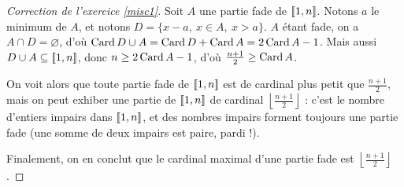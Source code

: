 \begin{proof}[Correction de l'exercice \ref{misc1}]

    Soit $A$ une partie fade de $[\![1,n]\!]$. 
    Notons $a$ le minimum de $A$, et notons $D=\lbrace x-a,\ x\in A,\ x>a\rbrace$. 
    $A$ étant fade, on a $A\cap D=\varnothing$, d'où $\operatorname{Card} D\cup A=\operatorname{Card} D+\operatorname{Card} A=2\operatorname{Card} A-1$.
    Mais aussi $D\cup A\subseteq [\![1,n]\!]$, donc $n\geq 2\operatorname{Card} A-1$, d'où $\frac{n+1}2\geq \operatorname{Card} A$. 

    On voit alors que toute partie fade de $[\![1,n]\!]$ est de cardinal plus petit que $\frac{n+1}2$, mais on peut exhiber 
    une partie de $[\![1,n]\!]$ de cardinal $\left\lfloor\frac{n+1}2\right\rfloor$ : c'est le nombre d'entiers impairs dans $[\![1,n]\!]$,
    et des nombres impairs forment toujours une partie fade (une somme de deux impairs est paire, pardi !).

    Finalement, on en conclut que le cardinal maximal d'une partie fade est $\left\lfloor\frac{n+1}2\right\rfloor$.

\end{proof}